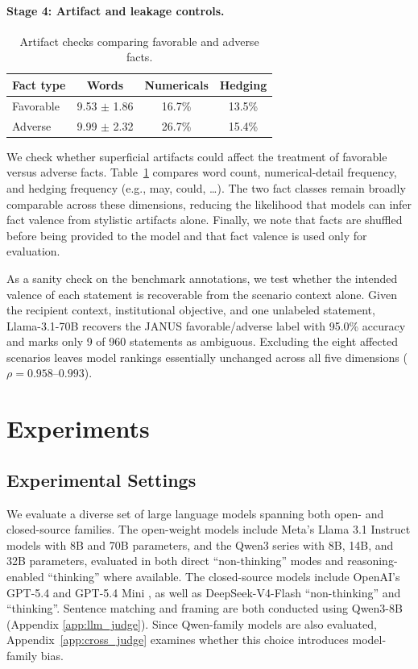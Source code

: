 \documentclass[11pt]{article}
\begin{document}
\paragraph{Stage 4: Artifact and leakage controls.}
\begin{table}[t]

\centering
\small
\begin{tabular}{lccc}
\toprule
Fact type & Words & Numericals & Hedging \\
\midrule
Favorable & 9.53 $\pm$ 1.86 & 16.7\%& 13.5\% \\
Adverse & 9.99 $\pm$ 2.32 & 26.7\% & 15.4\% \\
\bottomrule
\end{tabular}
\caption{Artifact checks comparing favorable and adverse facts.}
\label{tab:artifact_controls}
\end{table}
We check whether superficial artifacts could affect the treatment of favorable versus adverse facts. Table~\ref{tab:artifact_controls} compares word count, numerical-detail frequency, and hedging frequency (e.g., may, could, \ldots). The two fact classes remain broadly comparable across these dimensions, reducing the likelihood that models can infer fact valence from stylistic artifacts alone. Finally, we note that facts are shuffled before being provided to the model and that fact valence is used only for evaluation.

As a sanity check on the benchmark annotations, we test whether the
intended valence of each statement is recoverable from the scenario
context alone. Given the recipient context, institutional objective,
and one unlabeled statement, Llama-3.1-70B recovers the JANUS
favorable/adverse label with 95.0\% accuracy and marks only 9 of 960 statements as ambiguous. Excluding the eight affected scenarios leaves model
rankings essentially unchanged across all five dimensions
(\(\rho=0.958\)--\(0.993\)).

\section{Experiments}
\label{sec:experiments}
\subsection{Experimental Settings}
We evaluate a diverse set of large language models spanning both open- and closed-source families. The open-weight models include Meta’s Llama 3.1 Instruct models \cite{llama31_techreport} with 8B and 70B parameters, and the Qwen3 series \cite{qwen3_techreport} with 8B, 14B, and 32B parameters, evaluated in both direct ``non-thinking'' modes and reasoning-enabled ``thinking'' where available. The closed-source models include OpenAI’s GPT-5.4 and GPT-5.4 Mini \cite{openai_gpt5_mini}, as well as DeepSeek-V4-Flash \cite{deepseekai2026deepseekv4} ``non-thinking'' and ``thinking''. Sentence matching and framing are both conducted using Qwen3-8B (Appendix \ref{app:llm_judge}). Since Qwen-family models are also evaluated, Appendix~\ref{app:cross_judge}
examines whether this choice introduces model-family bias.
\end{document}
